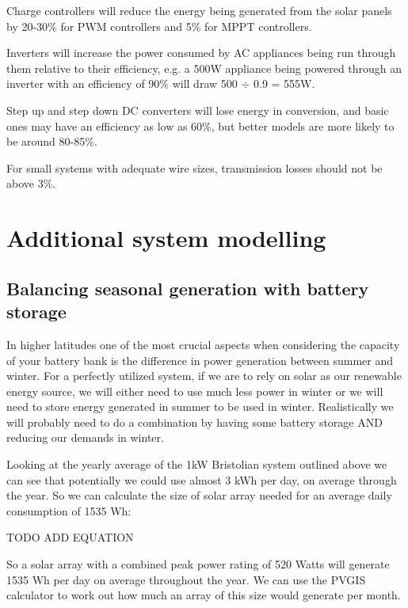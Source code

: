\documentclass{article}
\theoremstyle{definition}
\theoremstyle{definition}
\theoremstyle{remark}
\begin{document}
    Charge controllers will reduce the energy being generated from the solar panels by 20-30\% for PWM controllers and 5\% for MPPT controllers. 

    Inverters will increase the power consumed by AC appliances being run through them relative to their efficiency, e.g. a 500W appliance being powered through an inverter with an efficiency of 90\% will draw 500 \(\div\) 0.9 = 555W.

    Step up and step down DC converters will lose energy in conversion, and basic ones may have an efficiency as low as 60\%, but better models are more likely to be around 80-85\%. 

    For small systems with adequate wire sizes, transmission losses should not be above 3\%.  
  


\section{Additional system modelling} %
\label{sec:additional_system_modelling}

  \subsection{Balancing seasonal generation with battery storage} %
  \label{sub:balancing_seasonal_generation_with_battery_storage}

    In higher latitudes one of the most crucial aspects when considering the capacity of your battery bank is the difference in power generation between summer and winter. For a perfectly utilized system, if we are to rely on solar as our renewable energy source, we will either need to use much less power in winter or we will need to store energy generated in summer to be used in winter. Realistically we will probably need to do a combination by having some battery storage AND reducing our demands in winter.

    Looking at the yearly average of the 1kW Bristolian system outlined above we can see that potentially we could use almost 3 kWh per day, on average through the year. So we can calculate the size of solar array needed for an average daily consumption of 1535 Wh:

    TODO ADD EQUATION

    So a solar array with a combined peak power rating of 520 Watts will generate 1535 Wh per day on average throughout the year. We can use the PVGIS calculator to work out how much an array of this size would generate per month.
\end{document}
